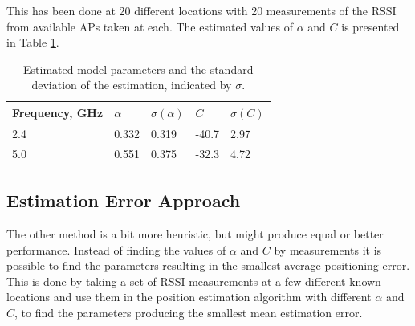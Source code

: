 \documentclass{LTHthesis}
\begin{document}
This has been done at 20 different locations with 20 measurements of the RSSI from available APs taken at each. The estimated values of $\alpha$ and $C$ is presented in Table \ref{table:est_par}.

\begin{table}
\begin{center}
\begin{tabular}{|l|l|l|l|l|}
\hline
\multicolumn{1}{|c|}{Frequency, GHz} & $\alpha$ & $\sigma(\alpha)$ & $C$ & $\sigma(C)$ \\
\hline
\hline
2.4 & 0.332 & 0.319 & -40.7 & 2.97 \\
5.0 & 0.551 & 0.375 & -32.3 & 4.72  \\
\hline
\end{tabular}
\end{center}
\caption{Estimated model parameters and the standard deviation of the estimation, indicated by $\sigma$.}\label{table:est_par}
\end{table}
%
\subsection{Estimation Error Approach}
The other method is a bit more heuristic, but might produce equal or better performance. Instead of finding the values of $\alpha$ and $C$ by measurements it is possible to find the parameters resulting in the smallest average positioning error. This is done by taking a set of RSSI measurements at a few different known locations and use them in the position estimation algorithm with different $\alpha$ and $C$, to find the parameters producing the smallest mean estimation error.   
\end{document}
